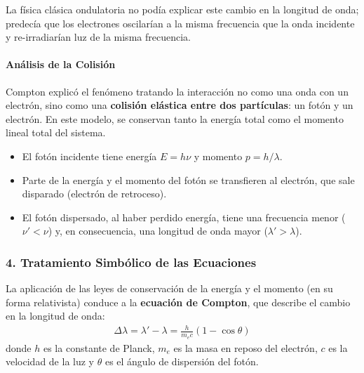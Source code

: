 La física clásica ondulatoria no podía explicar este cambio en la longitud de onda; predecía que los electrones oscilarían a la misma frecuencia que la onda incidente y re-irradiarían luz de la misma frecuencia.

\paragraph{Análisis de la Colisión}
Compton explicó el fenómeno tratando la interacción no como una onda con un electrón, sino como una \textbf{colisión elástica entre dos partículas}: un fotón y un electrón. En este modelo, se conservan tanto la energía total como el momento lineal total del sistema.
\begin{itemize}
    \item El fotón incidente tiene energía $E=h\nu$ y momento $p=h/\lambda$.
    \item Parte de la energía y el momento del fotón se transfieren al electrón, que sale disparado (electrón de retroceso).
    \item El fotón dispersado, al haber perdido energía, tiene una frecuencia menor ($\nu' < \nu$) y, en consecuencia, una longitud de onda mayor ($\lambda' > \lambda$).
\end{itemize}

\subsubsection*{4. Tratamiento Simbólico de las Ecuaciones}
La aplicación de las leyes de conservación de la energía y el momento (en su forma relativista) conduce a la \textbf{ecuación de Compton}, que describe el cambio en la longitud de onda:
\begin{gather}
    \Delta \lambda = \lambda' - \lambda = \frac{h}{m_e c}(1 - \cos\theta)
\end{gather}
donde $h$ es la constante de Planck, $m_e$ es la masa en reposo del electrón, $c$ es la velocidad de la luz y $\theta$ es el ángulo de dispersión del fotón.

